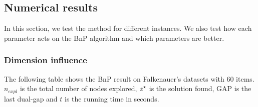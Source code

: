 \subsection{Numerical results}

In this section, we test the method for different instances. We also test how each parameter acts on the BnP algorithm and which parameters are better.\\

\subsubsection{Dimension influence}
The following table shows the BnP result on Falkenauer's datasets with 60 items. $n_{expl}$ is the total number of nodes explored, ${z}^{\star}$ is the solution found, GAP is the last dual-gap and $t$ is the running time in seconds.

